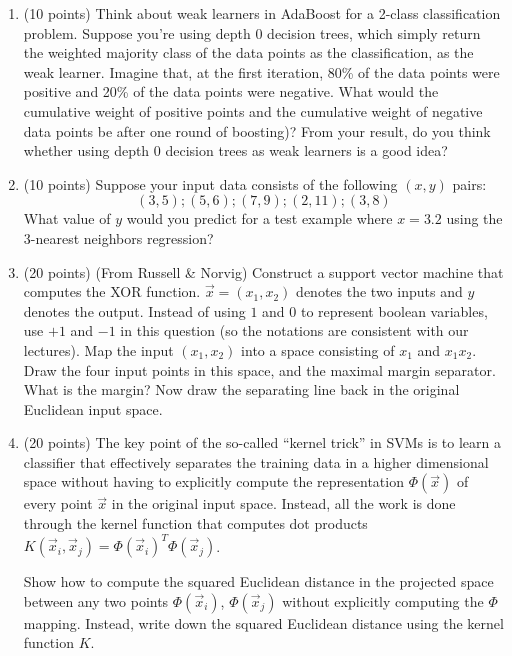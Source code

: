 \documentclass[11pt]{article}
\begin{document}
\begin{enumerate}

\item (10 points)
Think about weak learners in AdaBoost for a 2-class classification problem.
Suppose you're using depth 0 decision trees, which
  simply return the weighted majority class of the data points as the
  classification, as the weak learner. 
  Imagine that, at the first iteration, 80\% of the data points were positive 
  and 20\% of the data points were negative.
  What would the cumulative weight of positive points and the cumulative weight of negative data points be after one round of boosting)?
  From your result, do you think whether using
  depth 0 decision trees as weak learners is a good idea?


\item (10 points)
Suppose your input data consists of the following $(x, y)$ pairs:
\[
(3, 5); (5, 6); (7, 9); (2, 11); (3, 8)
\]
What value of $y$ would you predict for a test example where $x = 3.2$ 
using the 3-nearest neighbors regression?

\item (20 points) (From Russell \& Norvig)
Construct a support vector machine that computes the XOR function. 
$\vec{x} = (x_1,x_2)$ denotes the two inputs and $y$ denotes the output. 
Instead of using $1$ and $0$ to represent boolean variables, use $+1$ and $-1$ in this question (so the notations are consistent with our lectures).
Map the input $(x_1, x_2)$ into a space consisting of $x_1$ and $x_1 x_2$. 
Draw the four input points in this space, and the maximal margin separator. 
What is the margin? Now draw the separating line back in the original Euclidean input space.

\item (20 points)
The key point of the so-called ``kernel trick'' in SVMs is to learn a classifier that effectively separates the training data in a higher dimensional space without having to explicitly compute the representation $\Phi(\vec{x})$ of every point $\vec{x}$ in the original input space. Instead, all the work is done through the kernel function that computes dot products  $K(\vec{x}_i, \vec{x}_j) = \Phi(\vec{x}_i)^T \Phi(\vec{x}_j)$.

\vspace{8pt}
Show how to compute the squared Euclidean distance in the projected space between any two points $\Phi(\vec{x}_i)$, $\Phi(\vec{x}_j)$ without explicitly computing the $\Phi$ mapping. Instead, write down the squared Euclidean distance using the kernel function $K$.


\end{enumerate}
\end{document}
